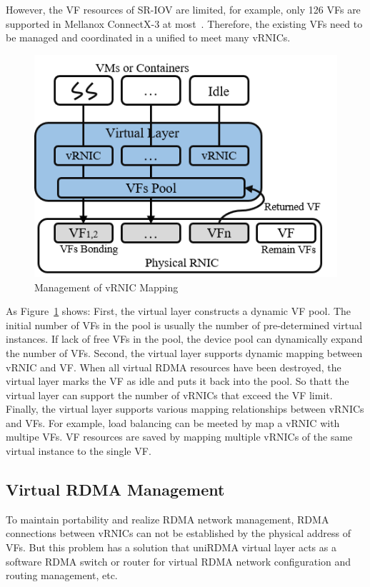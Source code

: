 However, the VF resources of SR-IOV are limited, for example, only 126 VFs are supported in Mellanox ConnectX-3 at most~\cite{ofed-manual}. Therefore, the existing VFs need to be managed and coordinated in a unified to meet many vRNICs.

\begin{figure}[!ht]
	\centering
	\includegraphics[width=0.9\linewidth]{images/vf-mapping}
	\caption{Management of vRNIC Mapping}
	\label{fig:vf-mapping}
\end{figure}

As Figure~\ref{fig:vf-mapping} shows: First, the virtual layer constructs a dynamic VF pool. The initial number of VFs in the pool is usually the number of pre-determined virtual instances. If lack of free VFs in the pool, the device pool can dynamically expand the number of VFs. Second, the virtual layer supports dynamic mapping between vRNIC and VF. When all virtual RDMA resources have been destroyed, the virtual layer marks the VF as idle and puts it back into the pool. So thatt the virtual layer can support the number of vRNICs that exceed the VF limit. Finally, the virtual layer supports various mapping relationships between vRNICs and VFs. For example, load balancing can be meeted by map a vRNIC with multipe VFs. VF resources are saved by mapping multiple vRNICs of the same virtual instance to the single VF. 

\subsection{Virtual RDMA Management}
To maintain portability and realize RDMA network management, RDMA connections between vRNICs can not be established by the physical address of VFs. But this problem has a solution that uniRDMA virtual layer acts as a software RDMA switch or router for virtual RDMA network configuration and routing management, etc.

